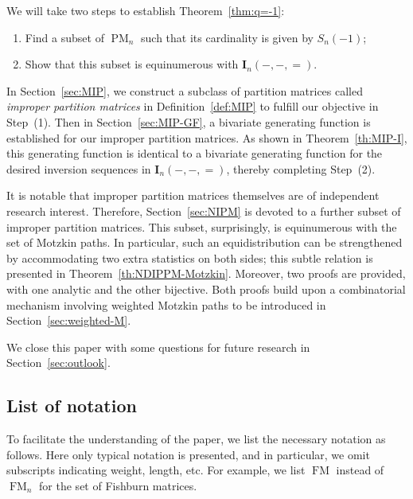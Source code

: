 \documentclass[12pt,reqno]{amsart}
\numberwithin{equation}{section}
\theoremstyle{theorem}
\theoremstyle{definition}
\theoremstyle{named}
\newcommand{\MatF}{\operatorname{FM}}
\newcommand{\MatP}{\operatorname{PM}}
\newcommand{\bI}{\mathbf{I}}
\begin{document}
We will take two steps to establish Theorem~\ref{thm:q=-1}:
\begin{enumerate}[label={\textup{(\arabic{*})}}, leftmargin=*, labelsep=5pt, align=left, itemsep=2pt, topsep=2pt, parsep=2pt]
	\item Find a subset of $\MatP_{n}$ such that its cardinality is given by $S_n(-1)$;
	
	\item Show that this subset is equinumerous with $\bI_n(-,-,=)$.
\end{enumerate}
In Section~\ref{sec:MIP}, we construct a subclass of partition matrices called \emph{improper partition matrices} in Definition~\ref{def:MIP} to fulfill our objective in Step~(1). Then in Section~\ref{sec:MIP-GF}, a bivariate generating function is established for our improper partition matrices. As shown in Theorem~\ref{th:MIP-I}, this generating function is identical to a bivariate generating function for the desired inversion sequences in $\bI_n(-,-,=)$, thereby completing Step~(2).

It is notable that improper partition matrices themselves are of independent research interest. Therefore, Section~\ref{sec:NIPM} is devoted to a further subset of improper partition matrices. This subset, surprisingly, is equinumerous with the set of Motzkin paths. In particular, such an equidistribution can be strengthened by accommodating two extra statistics on both sides; this subtle relation is presented in Theorem~\ref{th:NDIPPM-Motzkin}. Moreover, two proofs are provided, with one analytic and the other bijective. Both proofs build upon a combinatorial mechanism involving weighted Motzkin paths to be introduced in Section~\ref{sec:weighted-M}.

We close this paper with some questions for future research in Section~\ref{sec:outlook}.

\subsection{List of notation}

To facilitate the understanding of the paper, we list the necessary notation as follows. Here only typical notation is presented, and in particular, we omit subscripts indicating weight, length, etc. For example, we list $\MatF$ instead of $\MatF_n$ for the set of Fishburn matrices.
\end{document}
